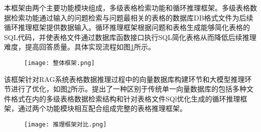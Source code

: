 本框架由两个主要功能模块组成，多级表格检索功能和循环推理框架。多级表格数据检索功能通过输入的问题检索与问题最相关的表格的数据库DB格式文件为后续循环推理框架提供数据输入。循环推理框架根据问题和表格生成能够简化表格的SQL代码，并使表格文件通过数据库函数接口执行SQL简化表格从而降低后续推理难度，提高回答质量。具体实现流程如图\ref{fig:4-1}所示。
\begin{figure}[h]
    \centering
    \texttt{[image: 整体框架.png]}
    \label{fig:4-1}
\end{figure}

该框架针对RAG系统表格数据推理过程中的向量数据库构建环节和大模型推理环节进行了优化，如图\ref{fig:4-2}所示。提出了一种区别于传统单一向量数据库的包括多种文件格式在内的多级表格数据检索结构和针对表格文件SQl优化生成的循环推理框架，通过两个功能模块相互配合组成完整的表格推理框架。
\begin{figure}[h]
    \centering
    \texttt{[image: 推理框架对比.png]}
    \label{fig:4-2}
\end{figure}

